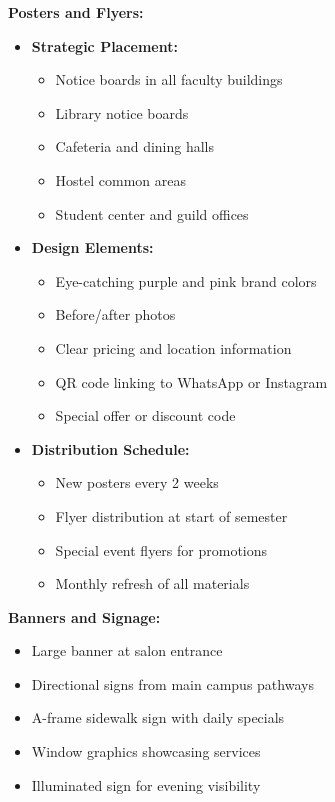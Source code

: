 \textbf{Posters and Flyers:}
\begin{itemize}[leftmargin=2em]
    \item \textbf{Strategic Placement:}
    \begin{itemize}
        \item Notice boards in all faculty buildings
        \item Library notice boards
        \item Cafeteria and dining halls
        \item Hostel common areas
        \item Student center and guild offices
    \end{itemize}
    
    \item \textbf{Design Elements:}
    \begin{itemize}
        \item Eye-catching purple and pink brand colors
        \item Before/after photos
        \item Clear pricing and location information
        \item QR code linking to WhatsApp or Instagram
        \item Special offer or discount code
    \end{itemize}
    
    \item \textbf{Distribution Schedule:}
    \begin{itemize}
        \item New posters every 2 weeks
        \item Flyer distribution at start of semester
        \item Special event flyers for promotions
        \item Monthly refresh of all materials
    \end{itemize}
\end{itemize}

\textbf{Banners and Signage:}
\begin{itemize}[leftmargin=2em]
    \item Large banner at salon entrance
    \item Directional signs from main campus pathways
    \item A-frame sidewalk sign with daily specials
    \item Window graphics showcasing services
    \item Illuminated sign for evening visibility
\end{itemize}

